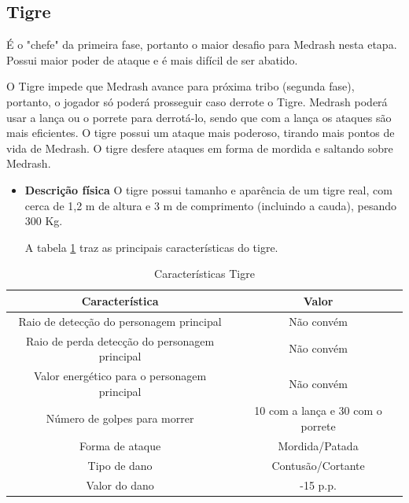 \subsection{Tigre}
É o "chefe" da primeira fase, portanto o maior desafio para Medrash nesta etapa. Possui maior poder de ataque e é mais difícil de ser abatido.


O Tigre impede que Medrash avance para próxima tribo (segunda fase), portanto, o jogador só poderá prosseguir caso derrote o Tigre. Medrash poderá usar a lança ou o porrete para derrotá-lo, sendo que com a lança os ataques são mais eficientes. O tigre possui um ataque mais poderoso, tirando mais pontos de vida de Medrash. O tigre desfere ataques em forma de mordida e saltando sobre Medrash.
\begin{itemize}
\item {\bf Descrição física}
O tigre possui tamanho e aparência de um tigre real, com cerca de 1,2 m de altura e 3 m de comprimento (incluindo a cauda), pesando 300 Kg.

A tabela \ref{table:tigre} traz as principais características do tigre.
\end{itemize}
\begin{table}[ht]
\begin{center}
\begin{tabular}{|c|c|}
\hline 
\textbf{Característica} & \textbf{Valor} \\ 
\hline 
Raio de detecção do personagem principal & Não convém \\ 
\hline 
Raio de perda detecção do personagem principal & Não convém \\ 
\hline 
Valor energético para o personagem principal & Não convém \\ 
\hline 
Número de golpes para morrer & 10 com a lança e 30 com o porrete \\ 
\hline 
Forma de ataque & Mordida/Patada\\ 
\hline 
Tipo de dano &  Contusão/Cortante \\ 
\hline 
Valor do dano & -15 p.p. \\ 
\hline 
\end{tabular} 
\end{center}
\caption{Características Tigre}
\label{table:tigre}
\end{table}
